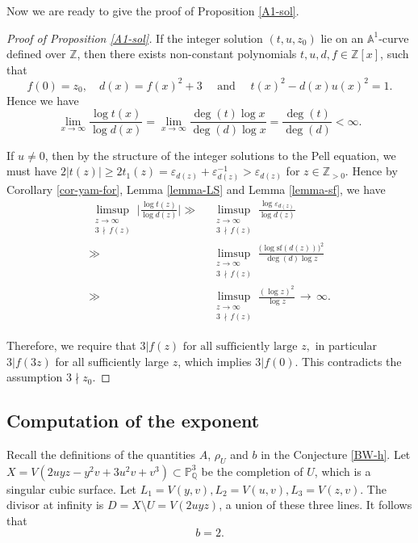\documentclass[reqno, 11pt, twoside]{amsart}
\numberwithin{equation}{section}
\theoremstyle{definition}
\renewcommand{\geq}{\geqslant}
\newcommand{\eps}{\varepsilon}
\newcommand{\PP}{\mathbb{P}}
\newcommand{\sqf}{\mathrm{sf}}
\newcommand{\AAA}{\mathbb{A}}
\newcommand{\QQ}{\mathbb{Q}}
\newcommand{\ZZ}{\mathbb{Z}}
\begin{document}
Now we are ready to give the proof of Proposition \ref{A1-sol}.

\begin{proof}[Proof of Proposition \ref{A1-sol}]
	If the integer solution $(t, u, z_0)$ lie on an $\AAA^1$-curve defined over $\ZZ$, then there exists non-constant polynomials $t, u, d, f \in \ZZ[x]$, such that 
	$$f(0) = z_0, \quad d(x) = f(x)^2 + 3 \quad \text{ and } \quad t(x)^2 - d(x)u(x)^2 = 1.$$ 
Hence we have
 $$\lim_{x \rightarrow \infty} \frac{\log t(x)}{\log d(x)} = \lim_{x \rightarrow \infty}\frac{\deg(t) \log x}{\deg(d) \log x} = \frac{\deg(t)}{\deg(d)} < \infty.$$ 
 
If $u \neq 0$, then by the structure of the integer solutions to the Pell equation, we must have $2|t(z)| \geq 2 t_1(z) = \eps_{d(z)} + \eps_{d(z)}^{-1} > \eps_{d(z)}$ for $z \in \ZZ_{> 0}$. Hence by Corollary \ref{cor-yam-for}, Lemma \ref{lemma-LS} and Lemma \ref{lemma-sf}, we have
\begin{align*}
	\limsup_{\substack{z \rightarrow \infty \\ 3 \, \nmid \, f(z)}} \Big| \frac{\log t(z) }{\log d(z)} \Big|  \gg &  \ \limsup_{\substack{z \rightarrow \infty \\ 3 \, \nmid \, f(z)}} \frac{\log  \eps_{d(z)}}{\log d(z)}  \\
\gg & \ \limsup_{\substack{z \rightarrow \infty \\ 3 \, \nmid \, f(z)}} \frac{\big(\log \sqf(d(z))\big)^{2}}{\deg(d) \log z} \\
\gg & \ \limsup_{\substack{z \rightarrow \infty \\ 3 \, \nmid \, f(z)}} \frac{(\log z)^2}{\log z} \, \rightarrow \, \infty.
\end{align*}

Therefore, we require that
	$3 | f(z) \text{ for all sufficiently large } z,$ in particular $3 | f(3z)$ for all sufficiently large $z$, which implies $3 | f(0)$. This contradicts the assumption $3 \nmid z_0$.
\end{proof}



\subsection{Computation of the exponent}\label{PicU}
Recall the definitions of the quantities $A$, $\rho_U$ and $b$ in the Conjecture \ref{BW-h}.
Let $X = V(2uyz - y^2v+3u^2v+v^3) \subset \PP_\QQ^3$ be the completion of $U$, which is a singular cubic surface.
Let $L_1 = V(y, v), L_2 = V(u, v), L_3 = V(z, v)$. The divisor at infinity is $D = X \setminus U = V(2uyz)$, a union of these three lines. It follows that
\begin{equation}\label{com-b}
	b = 2.
\end{equation}
\end{document}
